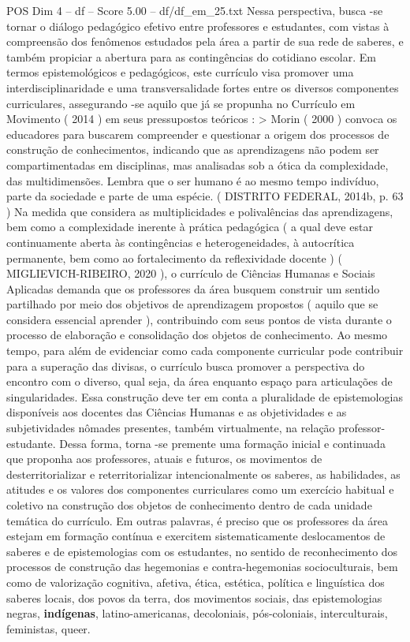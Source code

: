 \begin{textsample}{POS Dim 4 – df – Score 5.00 – df/df\_em\_25.txt}
Nessa perspectiva, busca -se tornar o diálogo pedagógico efetivo entre professores e estudantes, com vistas à compreensão dos fenômenos estudados pela área a partir de sua rede de saberes, e também propiciar a abertura para as contingências do cotidiano escolar.
Em termos epistemológicos e pedagógicos, este currículo visa promover uma interdisciplinaridade e uma transversalidade fortes entre os diversos componentes curriculares, assegurando -se aquilo que já se propunha no Currículo em Movimento ( 2014 ) em seus pressupostos teóricos : > Morin ( 2000 ) convoca os educadores para buscarem compreender e questionar a origem dos processos de construção de conhecimentos, indicando que as aprendizagens não podem ser compartimentadas em disciplinas, mas analisadas sob a ótica da complexidade, das multidimensões.
Lembra que o ser humano é ao mesmo tempo indivíduo, parte da sociedade e parte de uma espécie. ( DISTRITO FEDERAL, 2014b, p. 63 ) Na medida que considera as multiplicidades e polivalências das aprendizagens, bem como a complexidade inerente à prática pedagógica ( a qual deve estar continuamente aberta às contingências e heterogeneidades, à autocrítica permanente, bem como ao fortalecimento da reflexividade docente ) ( MIGLIEVICH-RIBEIRO, 2020 ), o currículo de Ciências Humanas e Sociais Aplicadas demanda que os professores da área busquem construir um sentido partilhado por meio dos objetivos de aprendizagem propostos ( aquilo que se considera essencial aprender ), contribuindo com seus pontos de vista durante o processo de elaboração e consolidação dos objetos de conhecimento.
Ao mesmo tempo, para além de evidenciar como cada componente curricular pode contribuir para a superação das divisas, o currículo busca promover a perspectiva do encontro com o diverso, qual seja, da área enquanto espaço para articulações de singularidades.
Essa construção deve ter em conta a pluralidade de epistemologias disponíveis aos docentes das Ciências Humanas e as objetividades e as subjetividades nômades presentes, também virtualmente, na relação professor-estudante.
Dessa forma, torna -se premente uma formação inicial e continuada que proponha aos professores, atuais e futuros, os movimentos de desterritorializar e reterritorializar intencionalmente os saberes, as habilidades, as atitudes e os valores dos componentes curriculares como um exercício habitual e coletivo na construção dos objetos de conhecimento dentro de cada unidade temática do currículo.
Em outras palavras, é preciso que os professores da área estejam em formação contínua e exercitem sistematicamente deslocamentos de saberes e de epistemologias com os estudantes, no sentido de reconhecimento dos processos de construção das hegemonias e contra-hegemonias socioculturais, bem como de valorização cognitiva, afetiva, ética, estética, política e linguística dos saberes locais, dos povos da terra, dos movimentos sociais, das epistemologias negras, \textbf{indígenas}, latino-americanas, decoloniais, pós-coloniais, interculturais, feministas, queer.

\end{textsample}
